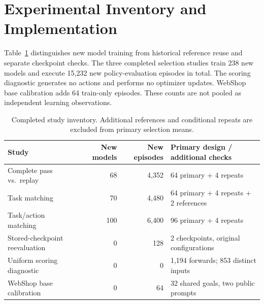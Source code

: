 \section{Experimental Inventory and Implementation}
\label{app:inventory}
Table~\ref{tab:inventory} distinguishes new model training from historical reference reuse and separate checkpoint checks. The three completed selection studies train 238 new models and execute 15,232 new policy-evaluation episodes in total. The scoring diagnostic generates no actions and performs no optimizer updates. WebShop base calibration adds 64 train-only episodes. These counts are not pooled as independent learning observations.

\begin{table}[h]
\centering
\caption{Completed study inventory. Additional references and conditional repeats are excluded from primary selection means.}
\label{tab:inventory}
\small
\begin{tabular}{lrrl}
\toprule
Study & New models & New episodes & Primary design / additional checks\\
\midrule
Complete pass vs.\ replay & 68 & 4,352 & 64 primary + 4 repeats\\
Task matching & 70 & 4,480 & 64 primary + 4 repeats + 2 references\\
Task/action matching & 100 & 6,400 & 96 primary + 4 repeats\\
Stored-checkpoint reevaluation & 0 & 128 & 2 checkpoints, original configurations\\
Uniform scoring diagnostic & 0 & 0 & 1,194 forwards; 853 distinct inputs\\
WebShop base calibration & 0 & 64 & 32 shared goals, two public prompts\\
\bottomrule
\end{tabular}
\end{table}

